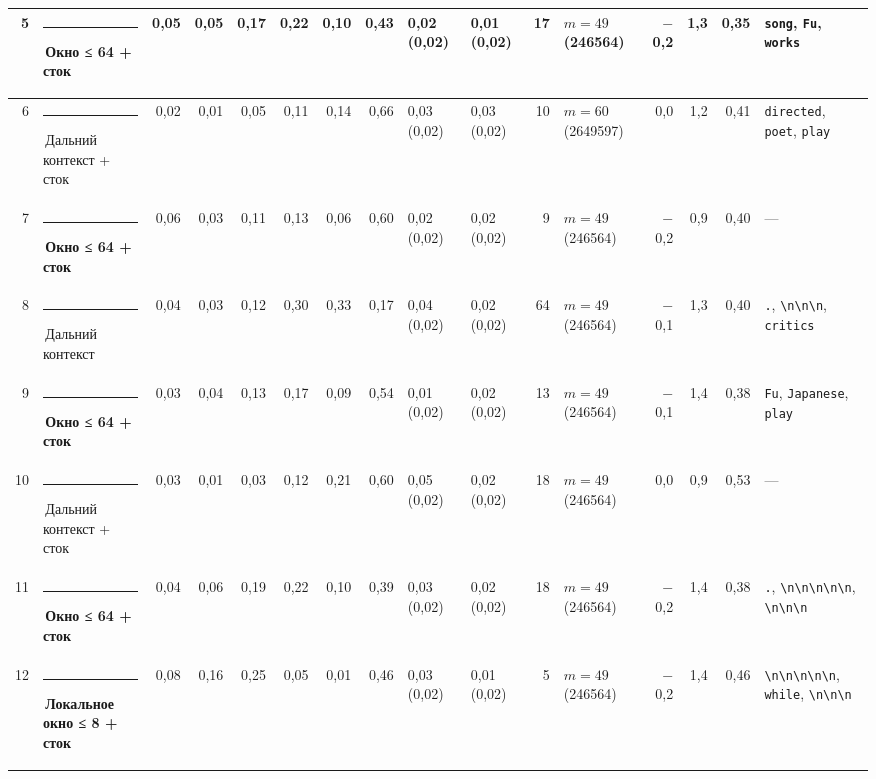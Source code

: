 \documentclass[10pt]{article}
\begin{document}
\begin{minipage}{\linewidth}
\begin{center}
{\begin{tabular}{|r|l|r|r|r|r|r|r|l|l|r|l|r|r|r|l|}
5 & \textcolor[HTML]{EDA100}{\rule{0.62em}{0.62em}}\,\textbf{Окно ≤ 64 + сток} & 0,05 & 0,05 & 0,17 & 0,22 & 0,10 & 0,43 & 0,02 (0,02) & 0,01 (0,02) & 17 & $m{=}49$ (246564) & $-$0,2 & 1,3 & 0,35 & \texttt{\textvisiblespace{}song}, \texttt{\textvisiblespace{}Fu}, \texttt{\textvisiblespace{}works} \\ \hline
6 & \textcolor[HTML]{C3C2B7}{\rule{0.62em}{0.62em}}\,Дальний контекст + сток & 0,02 & 0,01 & 0,05 & 0,11 & 0,14 & 0,66 & 0,03 (0,02) & 0,03 (0,02) & 10 & $m{=}60$ (2649597) & 0,0 & 1,2 & 0,41 & \texttt{\textvisiblespace{}directed}, \texttt{\textvisiblespace{}poet}, \texttt{\textvisiblespace{}play} \\ \hline
7 & \textcolor[HTML]{EDA100}{\rule{0.62em}{0.62em}}\,\textbf{Окно ≤ 64 + сток} & 0,06 & 0,03 & 0,11 & 0,13 & 0,06 & 0,60 & 0,02 (0,02) & 0,02 (0,02) & 9 & $m{=}49$ (246564) & $-$0,2 & 0,9 & 0,40 & — \\ \hline
8 & \textcolor[HTML]{C3C2B7}{\rule{0.62em}{0.62em}}\,Дальний контекст & 0,04 & 0,03 & 0,12 & 0,30 & 0,33 & 0,17 & 0,04 (0,02) & 0,02 (0,02) & 64 & $m{=}49$ (246564) & $-$0,1 & 1,3 & 0,40 & \texttt{\textvisiblespace{}.}, \texttt{\textvisiblespace{}\textbackslash{}n\textbackslash{}n\textbackslash{}n}, \texttt{\textvisiblespace{}critics} \\ \hline
9 & \textcolor[HTML]{EDA100}{\rule{0.62em}{0.62em}}\,\textbf{Окно ≤ 64 + сток} & 0,03 & 0,04 & 0,13 & 0,17 & 0,09 & 0,54 & 0,01 (0,02) & 0,02 (0,02) & 13 & $m{=}49$ (246564) & $-$0,1 & 1,4 & 0,38 & \texttt{\textvisiblespace{}Fu}, \texttt{\textvisiblespace{}Japanese}, \texttt{\textvisiblespace{}play} \\ \hline
10 & \textcolor[HTML]{C3C2B7}{\rule{0.62em}{0.62em}}\,Дальний контекст + сток & 0,03 & 0,01 & 0,03 & 0,12 & 0,21 & 0,60 & 0,05 (0,02) & 0,02 (0,02) & 18 & $m{=}49$ (246564) & 0,0 & 0,9 & 0,53 & — \\ \hline
11 & \textcolor[HTML]{EDA100}{\rule{0.62em}{0.62em}}\,\textbf{Окно ≤ 64 + сток} & 0,04 & 0,06 & 0,19 & 0,22 & 0,10 & 0,39 & 0,03 (0,02) & 0,02 (0,02) & 18 & $m{=}49$ (246564) & $-$0,2 & 1,4 & 0,38 & \texttt{\textvisiblespace{}.}, \texttt{\textvisiblespace{}\textbackslash{}n\textbackslash{}n\textbackslash{}n\textbackslash{}n\textbackslash{}n}, \texttt{\textvisiblespace{}\textbackslash{}n\textbackslash{}n\textbackslash{}n} \\ \hline
12 & \textcolor[HTML]{1BAF7A}{\rule{0.62em}{0.62em}}\,\textbf{Локальное окно ≤ 8 + сток} & 0,08 & 0,16 & 0,25 & 0,05 & 0,01 & 0,46 & 0,03 (0,02) & 0,01 (0,02) & 5 & $m{=}49$ (246564) & $-$0,2 & 1,4 & 0,46 & \texttt{\textvisiblespace{}\textbackslash{}n\textbackslash{}n\textbackslash{}n\textbackslash{}n\textbackslash{}n}, \texttt{\textvisiblespace{}while}, \texttt{\textvisiblespace{}\textbackslash{}n\textbackslash{}n\textbackslash{}n} \\ \hline

\end{tabular}}
\end{center}
\end{minipage}
\end{document}
